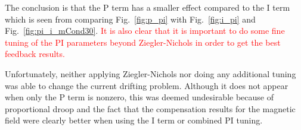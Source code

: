 
The conclusion is that the P term has a smaller effect compared to the
I term which is seen from comparing Fig.~\ref{fig:p_pi} with
Fig.~\ref{fig:i_pi} and Fig.~\ref{fig:pi_i_mCond30}.  \textcolor{red}{It is also clear
that it is important to do some fine tuning of the PI parameters
beyond Ziegler-Nichols in order to get the best feedback results.}

Unfortunately, neither applying Ziegler-Nichols nor doing any
additional tuning was able to change the current drifting problem.
Although it does not appear when only the P term is nonzero, this was
deemed undesirable because of proportional droop and the fact that the
compensation results for the magnetic field were clearly better when
using the I term or combined PI tuning.

